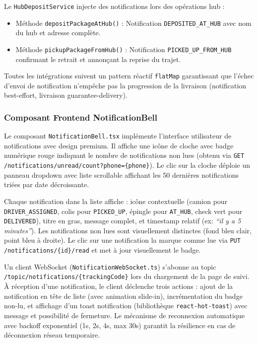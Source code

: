 Le \texttt{HubDepositService} injecte des notifications lors des opérations hub :

\begin{itemize}
    \item Méthode \texttt{depositPackageAtHub()} : Notification \texttt{DEPOSITED\_AT\_HUB} avec nom du hub et adresse complète.
    \item Méthode \texttt{pickupPackageFromHub()} : Notification \texttt{PICKED\_UP\_FROM\_HUB} confirmant le retrait et annonçant la reprise du trajet.
\end{itemize}

Toutes les intégrations suivent un pattern réactif \texttt{flatMap} garantissant que l'échec d'envoi de notification n'empêche pas la progression de la livraison (notification best-effort, livraison guarantee-delivery).

\subsubsection{Composant Frontend NotificationBell}

Le composant \texttt{NotificationBell.tsx} implémente l'interface utilisateur de notifications avec design premium. Il affiche une icône de cloche avec badge numérique rouge indiquant le nombre de notifications non lues (obtenu via \texttt{GET /notifications/unread/count?phone=\{phone\}}). Le clic sur la cloche déploie un panneau dropdown avec liste scrollable affichant les 50 dernières notifications triées par date décroissante.

Chaque notification dans la liste affiche : icône contextuelle (camion pour \texttt{DRIVER\_ASSIGNED}, colis pour \texttt{PICKED\_UP}, épingle pour \texttt{AT\_HUB}, check vert pour \texttt{DELIVERED}), titre en gras, message complet, et timestamp relatif (ex: \textit{``il y a 5 minutes''}). Les notifications non lues sont visuellement distinctes (fond bleu clair, point bleu à droite). Le clic sur une notification la marque comme lue via \texttt{PUT /notifications/\{id\}/read} et met à jour visuellement le badge.

Un client WebSocket (\texttt{NotificationWebSocket.ts}) s'abonne au topic \texttt{/topic/notifications/\{trackingCode\}} lors du chargement de la page de suivi. À réception d'une notification, le client déclenche trois actions : ajout de la notification en tête de liste (avec animation slide-in), incrémentation du badge non-lu, et affichage d'un toast notification (bibliothèque \texttt{react-hot-toast}) avec message et possibilité de fermeture. Le mécanisme de reconnexion automatique avec backoff exponentiel (1s, 2s, 4s, max 30s) garantit la résilience en cas de déconnexion réseau temporaire.

